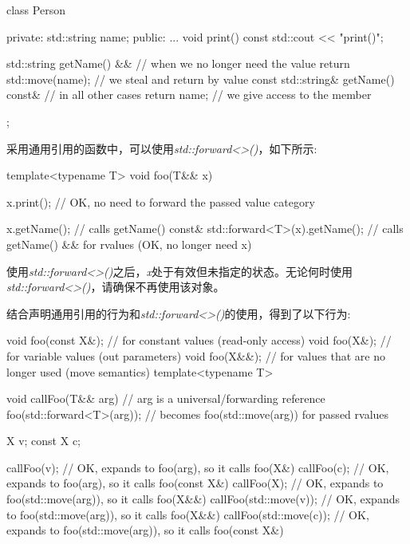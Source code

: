 \begin{codebox}[cpp]
class Person
{
private:
  std::string name;
public:
  ...
  void print() const {
    std::cout << "print()\n";
  }

  std::string getName() && { // when we no longer need the value
    return std::move(name); // we steal and return by value
  }
  const std::string& getName() const& { // in all other cases
    return name; // we give access to the member
  }
};
\end{codebox}

采用通用引用的函数中，可以使用\textit{std::\allowbreak{}forward<\allowbreak{}>(\allowbreak{})\allowbreak{}}，如下所示:\par

\begin{codebox}[cpp]
template<typename T>
void foo(T&& x)
{
  x.print(); // OK, no need to forward the passed value category

  x.getName(); // calls getName() const&
  std::forward<T>(x).getName(); // calls getName() && for rvalues (OK, no longer need x)
}
\end{codebox}

使用\textit{std::\allowbreak{}forward<\allowbreak{}>(\allowbreak{})\allowbreak{}}之后，\textit{x}处于有效但未指定的状态。无论何时使用\textit{std::\allowbreak{}forward<\allowbreak{}>(\allowbreak{})\allowbreak{}}，请确保不再使用该对象。\par


结合声明通用引用的行为和\textit{std::\allowbreak{}forward<\allowbreak{}>(\allowbreak{})\allowbreak{}}的使用，得到了以下行为:\par

\begin{codebox}[cpp]
void foo(const X&); // for constant values (read-only access)
void foo(X&); // for variable values (out parameters)
void foo(X&&); // for values that are no longer used (move semantics)
template<typename T>

void callFoo(T&& arg) { // arg is a universal/forwarding reference
  foo(std::forward<T>(arg)); // becomes foo(std::move(arg)) for passed rvalues
}

X v;
const X c;

callFoo(v); // OK, expands to foo(arg), so it calls foo(X&)
callFoo(c); // OK, expands to foo(arg), so it calls foo(const X&)
callFoo(X{}); // OK, expands to foo(std::move(arg)), so it calls foo(X&&)
callFoo(std::move(v)); // OK, expands to foo(std::move(arg)), so it calls foo(X&&)
callFoo(std::move(c)); // OK, expands to foo(std::move(arg)), so it calls foo(const X&)
\end{codebox}


